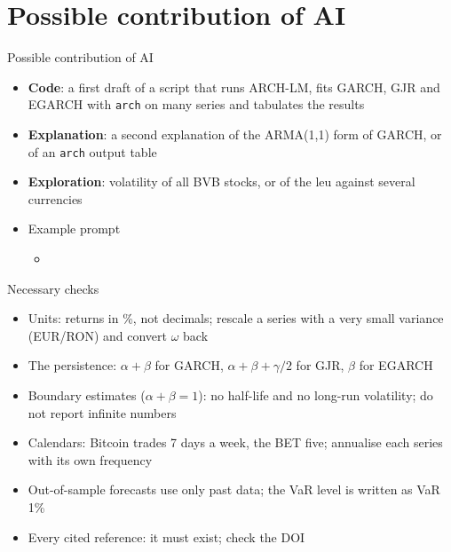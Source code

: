 \section{Possible contribution of AI}

\begin{frame}{Possible contribution of AI}
\itemsize{\small}
\begin{itemize}
    \item \textbf{Code}: a first draft of a script that runs ARCH-LM, fits GARCH, GJR and EGARCH with \texttt{arch} on many series and tabulates the results
    \item \textbf{Explanation}: a second explanation of the ARMA(1,1) form of GARCH, or of an \texttt{arch} output table
    \item \textbf{Exploration}: volatility of all BVB stocks, or of the leu against several currencies
    \item Example prompt
    \begin{itemize}
        \item {}
    \end{itemize}
\end{itemize}
\end{frame}

\begin{frame}{Necessary checks}
\itemsize{\small}
\begin{itemize}
    \item Units: returns in \%, not decimals; rescale a series with a very small variance (EUR/RON) and convert $\omega$ back
    \item The persistence: $\alpha + \beta$ for GARCH, $\alpha + \beta + \gamma/2$ for GJR, $\beta$ for EGARCH
    \item Boundary estimates ($\alpha + \beta = 1$): no half-life and no long-run volatility; do not report infinite numbers
    \item Calendars: Bitcoin trades 7 days a week, the BET five; annualise each series with its own frequency
    \item Out-of-sample forecasts use only past data; the VaR level is written as VaR 1\%
    \item Every cited reference: it must exist; check the DOI
\end{itemize}
\end{frame}


